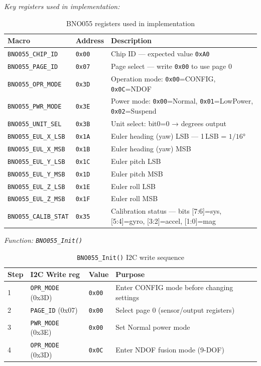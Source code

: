 \documentclass[12pt,a4paper]{article}
\begin{document}
\medskip
\textit{Key registers used in implementation:}

\begin{table}[H]
\centering
\begin{tabular}{lll}
\hline
\textbf{Macro} & \textbf{Address} & \textbf{Description} \\
\hline
\texttt{BNO055\_CHIP\_ID}   & \texttt{0x00} & Chip ID — expected value \texttt{0xA0} \\
\texttt{BNO055\_PAGE\_ID}   & \texttt{0x07} & Page select — write \texttt{0x00} to use page 0 \\
\texttt{BNO055\_OPR\_MODE}  & \texttt{0x3D} & Operation mode: \texttt{0x00}=CONFIG, \texttt{0x0C}=NDOF \\
\texttt{BNO055\_PWR\_MODE}  & \texttt{0x3E} & Power mode: \texttt{0x00}=Normal, \texttt{0x01}=LowPower, \texttt{0x02}=Suspend \\
\texttt{BNO055\_UNIT\_SEL}  & \texttt{0x3B} & Unit select: bit0=0 → degrees output \\
\texttt{BNO055\_EUL\_X\_LSB}& \texttt{0x1A} & Euler heading (yaw) LSB — 1\,LSB = \(1/16\)° \\
\texttt{BNO055\_EUL\_X\_MSB}& \texttt{0x1B} & Euler heading (yaw) MSB \\
\texttt{BNO055\_EUL\_Y\_LSB}& \texttt{0x1C} & Euler pitch LSB \\
\texttt{BNO055\_EUL\_Y\_MSB}& \texttt{0x1D} & Euler pitch MSB \\
\texttt{BNO055\_EUL\_Z\_LSB}& \texttt{0x1E} & Euler roll LSB \\
\texttt{BNO055\_EUL\_Z\_MSB}& \texttt{0x1F} & Euler roll MSB \\
\texttt{BNO055\_CALIB\_STAT}& \texttt{0x35} & Calibration status — bits [7:6]=sys, [5:4]=gyro, [3:2]=accel, [1:0]=mag \\
\hline
\end{tabular}
\caption{BNO055 registers used in implementation}
\end{table}

\textit{Function: \texttt{BNO055\_Init()}}

\begin{table}[H]
\centering
\begin{tabular}{lllp{4.5cm}}
\hline
\textbf{Step} & \textbf{I2C Write reg} & \textbf{Value} & \textbf{Purpose} \\
\hline
1 & \texttt{OPR\_MODE} (0x3D) & \texttt{0x00} & Enter CONFIG mode before changing settings \\
2 & \texttt{PAGE\_ID}  (0x07) & \texttt{0x00} & Select page 0 (sensor/output registers) \\
3 & \texttt{PWR\_MODE} (0x3E) & \texttt{0x00} & Set Normal power mode \\
4 & \texttt{OPR\_MODE} (0x3D) & \texttt{0x0C} & Enter NDOF fusion mode (9-DOF) \\
\hline
\end{tabular}
\caption{\texttt{BNO055\_Init()} I2C write sequence}
\end{table}
\end{document}
